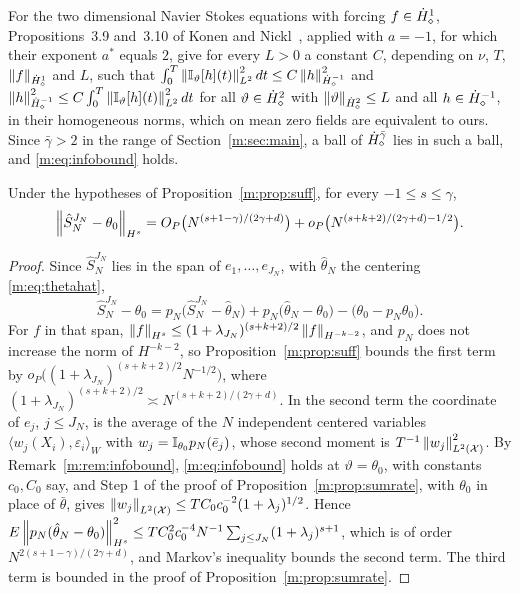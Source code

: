 \begin{remark}
For the two dimensional Navier Stokes equations with forcing $f\in\dot H^{1}_\diamond$, Propositions~3.9 and~3.10 of Konen and Nickl~\cite{konennickl2026}, applied with $a=-1$, for which their exponent $a^*$ equals $2$, give for every $L>0$ a constant $C$, depending on $\nu$, $T$, $\left\|f\right\|_{\dot H^{1}_\diamond}$ and $L$, such that $\int_0^T\left\|\mathbb{I}_\vartheta[h](t)\right\|^2_{L^2}dt\le C\left\|h\right\|^2_{\dot H^{-1}_\diamond}$ and $\left\|h\right\|^2_{\dot H^{-1}_\diamond}\le C\int_0^T\left\|\mathbb{I}_\vartheta[h](t)\right\|^2_{L^2}dt$ for all $\vartheta\in\dot H^{2}_\diamond$ with $\left\|\vartheta\right\|_{\dot H^{2}_\diamond}\le L$ and all $h\in\dot H^{-1}_\diamond$, in their homogeneous norms, which on mean zero fields are equivalent to ours. Since $\bar\gamma>2$ in the range of Section~\ref{m:sec:main}, a ball of $\dot H^{\bar\gamma}_\diamond$ lies in such a ball, and \eqref{m:eq:infobound} holds.
\end{remark}

\begin{corollary}\label{m:cor:sumsuff}
Under the hypotheses of Proposition~\ref{m:prop:suff}, for every $-1\le s\le\gamma$,
\[
\left\|\hat S^{J_N}_N-\theta_0\right\|_{H^s}=O_P\big(N^{(s+1-\gamma)/(2\gamma+d)}\big)+o_P\big(N^{(s+k+2)/(2\gamma+d)-1/2}\big).
\]
\end{corollary}

\begin{proof}
Since $\hat S^{J_N}_N$ lies in the span of $e_1,\dots,e_{J_N}$, with $\hat\theta_N$ the centering \eqref{m:eq:thetahat},
\[
\hat S^{J_N}_N-\theta_0=p_N\big(\hat S^{J_N}_N-\hat\theta_N\big)+p_N\big(\hat\theta_N-\theta_0\big)-\big(\theta_0-p_N\theta_0\big).
\]
For $f$ in that span, $\left\|f\right\|_{H^s}\le(1+\lambda_{J_N})^{(s+k+2)/2}\left\|f\right\|_{H^{-k-2}}$, and $p_N$ does not increase the norm of $H^{-k-2}$, so Proposition~\ref{m:prop:suff} bounds the first term by $o_P\big((1+\lambda_{J_N})^{(s+k+2)/2}N^{-1/2}\big)$, where $(1+\lambda_{J_N})^{(s+k+2)/2}\asymp N^{(s+k+2)/(2\gamma+d)}$. In the second term the coordinate of $e_j$, $j\le J_N$, is the average of the $N$ independent centered variables $\langle w_j(X_i),\varepsilon_i\rangle_W$ with $w_j=\mathbb{I}_{\theta_0}p_N(\bar e_j)$, whose second moment is $T^{-1}\left\|w_j\right\|^2_{L^2(\mathcal X)}$. By Remark~\ref{m:rem:infobound}, \eqref{m:eq:infobound} holds at $\vartheta=\theta_0$, with constants $c_0,C_0$ say, and Step 1 of the proof of Proposition~\ref{m:prop:sumrate}, with $\theta_0$ in place of $\bar\theta$, gives $\left\|w_j\right\|_{L^2(\mathcal X)}\le TC_0c_0^{-2}(1+\lambda_j)^{1/2}$. Hence $E\left\|p_N(\hat\theta_N-\theta_0)\right\|^2_{H^s}\le TC_0^2c_0^{-4}N^{-1}\sum_{j\le J_N}(1+\lambda_j)^{s+1}$, which is of order $N^{2(s+1-\gamma)/(2\gamma+d)}$, and Markov's inequality bounds the second term. The third term is bounded in the proof of Proposition~\ref{m:prop:sumrate}.
\end{proof}

